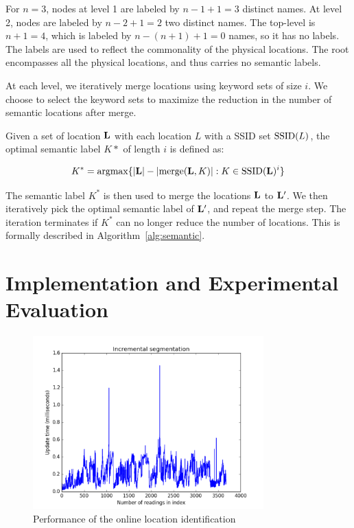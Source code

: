 For $n=3$, nodes at level 1 are labeled by $n-1+1=3$ distinct names.  At level
2, nodes are labeled by $n-2+1=2$ two distinct names.  The top-level is $n+1=4$,
which is labeled by $n-(n+1)+1 = 0$ names, so it has no labels.
The labels are used to reflect the commonality of the physical locations.
The root encompasses all the physical locations, and thus carries no semantic
labels.

At each level,  we iteratively merge locations using keyword sets of size
$i$.  We choose to select the keyword sets 
to maximize the reduction in the number of semantic locations after
merge.

Given a set of location $\mathbf{L}$ with each location $L$ with a SSID set $\mathrm{SSID}(L)$,
the optimal semantic label $K*$ of length $i$ is defined as:

$$ K^* = \mathrm{argmax} \{|\mathbf{L}| - |\mathrm{merge}(\mathbf{L}, K)| : K\in\mathrm{SSID}(\mathbf{L})^i\}$$

The semantic label $K^*$ is then used to merge the locations $\mathbf{L}$ to $\mathbf{L}'$.  We then
iteratively pick the optimal semantic label of $\mathbf{L}'$, and repeat the merge
step.  The iteration terminates if $K^*$ can no longer reduce the number of locations.
This is formally described in Algorithm~\ref{alg:semantic}.

\section{Implementation and Experimental Evaluation}

\begin{figure}[t]
    \centering
    \includegraphics[width=3.5in]{../plots/incremental.pdf}
    \caption{Performance of the online location identification}
    \label{fig:incremental}
\end{figure}
